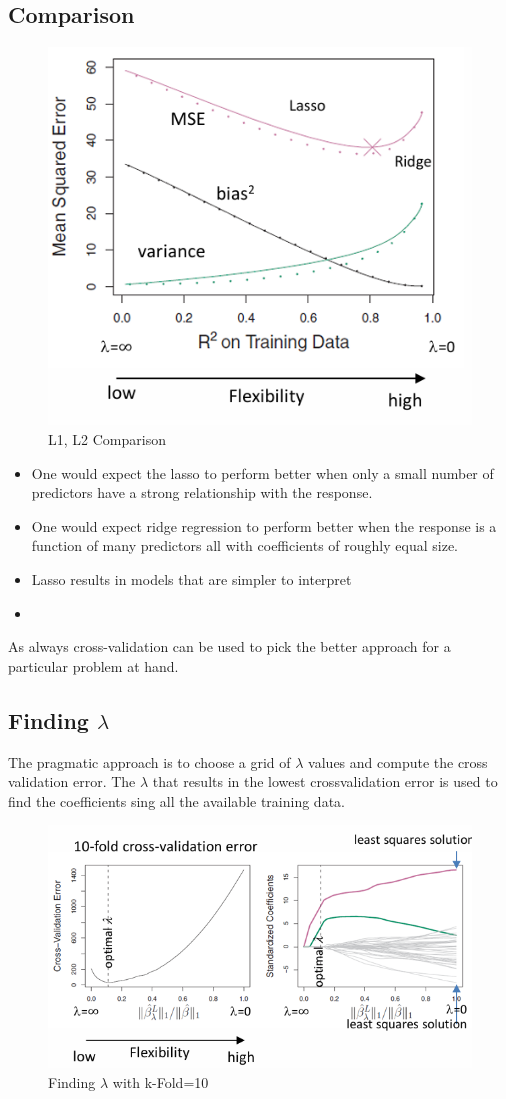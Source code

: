 \documentclass[../Main.tex]{subfiles}
\begin{document}
\subsection{Comparison}

\begin{figure}[H]
    \centering
    \includegraphics[width=0.5\linewidth]{Images/l1-l2-comparison.png}
    \caption{L1, L2 Comparison}
\end{figure}

\begin{itemize}
    \item One would expect the lasso to perform 
    better when only a small number of 
    predictors have a strong relationship with 
    the response.
    \item One would expect ridge regression to 
    perform better when the response is a 
    function of many predictors all with 
    coefficients of roughly equal size.
    \item Lasso results in models that 
    are simpler to interpret
    \item 
\end{itemize}
As always cross-validation can be used to 
pick the better approach for a particular 
problem at hand.

\subsection{Finding \(\lambda\)}
The pragmatic approach is to choose a grid of \(\lambda\) values and compute the cross validation error.
The \(\lambda\) that results in the lowest crossvalidation error is used to find the coefficients 
sing all the available training data.
\begin{figure}[H]
    \centering
    \includegraphics[width=0.75\linewidth]{Images/finding-ld.png}
    \caption{Finding \(\lambda\) with k-Fold=10}
\end{figure}
\end{document}
